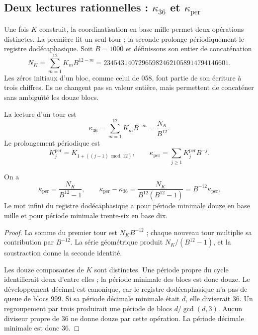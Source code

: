

\subsection{Deux lectures rationnelles : \texorpdfstring{\(\kappa_{36}\)}{kappa36} et \texorpdfstring{\(\kappa_{\mathrm{per}}\)}{kappa périodique}}
\label{subsec:k-kappas}

Une fois \(K\) construit, la coordinatisation en base mille permet deux opérations
distinctes. La première lit un seul tour ; la seconde prolonge périodiquement le registre
dodécaphasique. Soit \(B=1000\) et définissons son entier de concaténation
\begin{equation}
 N_K=\sum_{m=1}^{12}K_mB^{12-m}
 =234543140729659824621058914794146601.
 \label{eq:k-numerador}
\end{equation}
Les zéros initiaux d'un bloc, comme celui de 058, font partie de son écriture
à trois chiffres. Ils ne changent pas sa valeur entière, mais permettent de concaténer
sans ambiguïté les douze blocs.

\begin{definition}
\label{def:k-kappas}
La lecture d'un tour est
\[
 \kappa_{36}=\sum_{m=1}^{12}K_mB^{-m}=\frac{N_K}{B^{12}}.
\]
Le prolongement périodique est
\[
 K_j^{\mathrm{per}}=K_{1+((j-1)\bmod12)},\qquad
 \kappa_{\mathrm{per}}=\sum_{j\geq1}K_j^{\mathrm{per}}B^{-j}.
\]
\end{definition}

\begin{proposition}
\label{prop:k-periodo}
On a
\begin{equation}
 \kappa_{\mathrm{per}}=\frac{N_K}{B^{12}-1},\qquad
 \kappa_{\mathrm{per}}-\kappa_{36}
 =\frac{N_K}{B^{12}(B^{12}-1)}
 =B^{-12}\kappa_{\mathrm{per}}.
 \label{eq:k-diferencia-kappas}
\end{equation}
Le mot infini du registre dodécaphasique a pour période minimale douze en base mille et pour période minimale trente-six en base dix.
\end{proposition}

\begin{proof}
La somme du premier tour est \(N_KB^{-12}\) ; chaque nouveau tour
multiplie sa contribution par \(B^{-12}\). La série géométrique produit
\(N_K/(B^{12}-1)\), et la soustraction donne la seconde identité.

Les douze composantes de \(K\) sont distinctes. Une période propre du cycle
identifierait deux d'entre elles ; la période minimale des blocs est donc
douze. Le développement décimal est canonique, car le registre dodécaphasique n'a pas de queue
de blocs 999. Si sa période décimale minimale était \(d\), elle diviserait
36. Un regroupement par trois produirait une période de blocs
\(d/\gcd(d,3)\). Aucun diviseur propre de 36 ne donne douze par cette
opération. La période décimale minimale est donc 36.
\end{proof}

